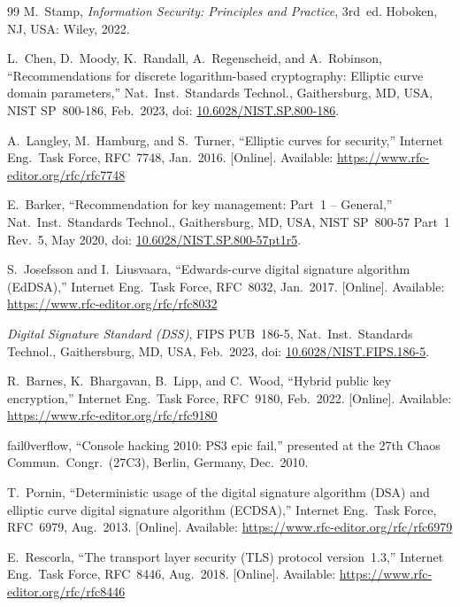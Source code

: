 \documentclass[11pt,a4paper]{article}
\begin{document}
\clearpage
\begin{thebibliography}{99}
\footnotesize\setlength{\itemsep}{1pt}\setlength{\parsep}{0pt}\setlength{\parskip}{0pt}
M.~Stamp, \emph{Information Security: Principles and Practice}, 3rd~ed. Hoboken, NJ, USA: Wiley, 2022.

L.~Chen, D.~Moody, K.~Randall, A.~Regenscheid, and A.~Robinson, ``Recommendations for discrete logarithm-based cryptography: Elliptic curve domain parameters,'' Nat.\ Inst.\ Standards Technol., Gaithersburg, MD, USA, NIST SP~800-186, Feb.~2023, doi: \href{https://doi.org/10.6028/NIST.SP.800-186}{10.6028/NIST.SP.800-186}.

A.~Langley, M.~Hamburg, and S.~Turner, ``Elliptic curves for security,'' Internet Eng.\ Task Force, RFC~7748, Jan.~2016. [Online]. Available: \url{https://www.rfc-editor.org/rfc/rfc7748}

E.~Barker, ``Recommendation for key management: Part~1 -- General,'' Nat.\ Inst.\ Standards Technol., Gaithersburg, MD, USA, NIST SP~800-57 Part~1 Rev.~5, May 2020, doi: \href{https://doi.org/10.6028/NIST.SP.800-57pt1r5}{10.6028/NIST.SP.800-57pt1r5}.

S.~Josefsson and I.~Liusvaara, ``Edwards-curve digital signature algorithm (EdDSA),'' Internet Eng.\ Task Force, RFC~8032, Jan.~2017. [Online]. Available: \url{https://www.rfc-editor.org/rfc/rfc8032}

\emph{Digital Signature Standard (DSS)}, FIPS PUB~186-5, Nat.\ Inst.\ Standards Technol., Gaithersburg, MD, USA, Feb.~2023, doi: \href{https://doi.org/10.6028/NIST.FIPS.186-5}{10.6028/NIST.FIPS.186-5}.

R.~Barnes, K.~Bhargavan, B.~Lipp, and C.~Wood, ``Hybrid public key encryption,'' Internet Eng.\ Task Force, RFC~9180, Feb.~2022. [Online]. Available: \url{https://www.rfc-editor.org/rfc/rfc9180}

fail0verflow, ``Console hacking 2010: PS3 epic fail,'' presented at the 27th Chaos Commun.\ Congr.\ (27C3), Berlin, Germany, Dec.~2010.

T.~Pornin, ``Deterministic usage of the digital signature algorithm (DSA) and elliptic curve digital signature algorithm (ECDSA),'' Internet Eng.\ Task Force, RFC~6979, Aug.~2013. [Online]. Available: \url{https://www.rfc-editor.org/rfc/rfc6979}

E.~Rescorla, ``The transport layer security (TLS) protocol version~1.3,'' Internet Eng.\ Task Force, RFC~8446, Aug.~2018. [Online]. Available: \url{https://www.rfc-editor.org/rfc/rfc8446}


\end{thebibliography}
\end{document}

